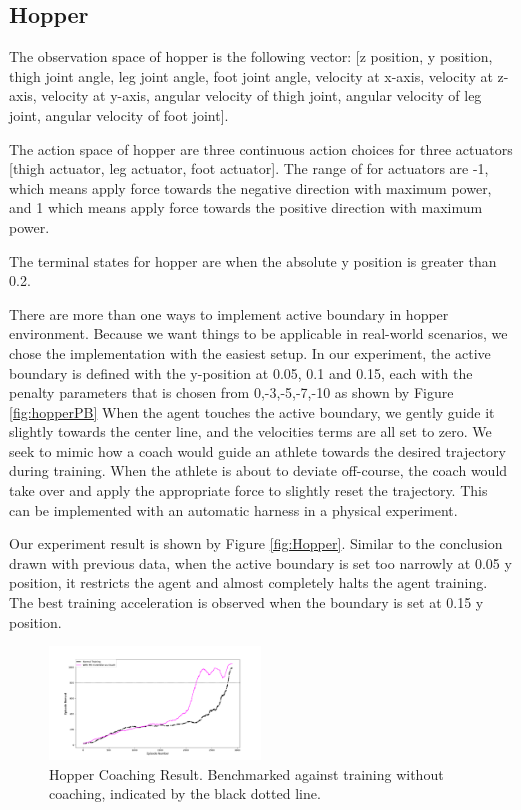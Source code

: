 \documentclass[journal]{IEEEtran}
\begin{document}
\subsection{Hopper}
The observation space of hopper is the following vector: [z position, y position, thigh joint angle, leg joint angle, foot joint angle, velocity at x-axis, velocity at z-axis, velocity at y-axis, angular velocity of thigh joint, angular velocity of leg joint, angular velocity of foot joint].

The action space of hopper are three continuous action choices for three actuators [thigh actuator, leg actuator, foot actuator]. The range of for actuators are -1, which means apply force towards the negative direction with maximum power, and 1 which means apply force towards the positive direction with maximum power.

The terminal states for hopper are when the absolute y position is greater than 0.2.

There are more than one ways to implement active boundary in hopper environment. Because we want things to be applicable in real-world scenarios, we chose the implementation with the easiest setup. In our experiment, the active boundary is defined with the y-position at 0.05, 0.1 and 0.15, each with the penalty parameters that is chosen from 0,-3,-5,-7,-10 as shown by Figure \ref{fig:hopperPB} When the agent touches the active boundary, we gently guide it slightly towards the center line, and the velocities terms are all set to zero. We seek to mimic how a coach would guide an athlete towards the desired trajectory during training. When the athlete is about to deviate off-course, the coach would take over and apply the appropriate force to slightly reset the trajectory. This can be implemented with an automatic harness in a physical experiment.

Our experiment result is shown by Figure \ref{fig:Hopper}. Similar to the conclusion drawn with previous data, when the active boundary is set too narrowly at 0.05 y position, it restricts the agent and almost completely halts the agent training. The best training acceleration is observed when the boundary is set at 0.15 y position.

\begin{figure}
     \centering
      \includegraphics[width=0.5\textwidth]{hopper.png}
      \caption{Hopper Coaching Result. Benchmarked against training without coaching, indicated by the black dotted line.}
      \label{fig:hopper}
\end{figure}
\end{document}
